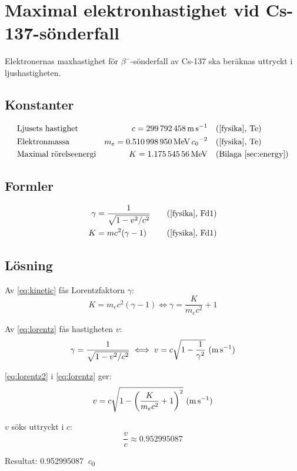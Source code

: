 \section{Maximal elektronhastighet vid Cs-137-sönderfall} \label{sec:speed}

Elektronernas maxhastighet för $\beta^-$-sönderfall av Cs-137 ska beräknas
uttryckt i ljushastigheten.

\subsection*{Konstanter}

\begin{align*}
    & \text{Ljusets hastighet}     & c   = \qty{299792458}{\m\per\s}                  &\quad \fysika{Te}                      \\
    & \text{Elektronmassa}         & m_e = \qty{0.510998950}{\MeV\per\clight\squared} &\quad \fysika{Te}                      \\
    & \text{Maximal rörelseenergi} & K   = \qty{1.17554556}{\MeV}                     &\quad \text{(Bilaga~\ref{sec:energy})}
\end{align*}

\subsection*{Formler}

\begin{align}
    \gamma &= \frac{1}{\sqrt{1 - v^2/c^2}} &\quad \fysika{Fd1} \label{eq:lorentz} \\
         K &= mc^2(\gamma - 1)             &\quad \fysika{Fd1} \label{eq:kinetic}
\end{align}

\subsection*{Lösning}

Av \eqref{eq:kinetic} fås Lorentzfaktorn $\gamma$:
%
\begin{equation}
    K = m_e c^2(\gamma - 1) \iff \gamma = \frac{K}{m_e c^2} + 1 \label{eq:lorentz2}
\end{equation}

Av \eqref{eq:lorentz} fås hastigheten $v$:
%
\begin{equation}
    \gamma = \frac{1}{\sqrt{1 - v^2/c^2}} \iff v = c \sqrt{1 - \frac{1}{\gamma^2}}~\text{(\unit{\m\per\s})} \label{eq:speed}
\end{equation}

\eqref{eq:lorentz2} i \eqref{eq:lorentz} ger:
%
\begin{equation}
    v = c \sqrt{1 - \left( \frac{K}{m_e c^2} + 1 \right)^2}~\text{(\unit{\m\per\s})}
\end{equation}

$v$ söks uttryckt i $c$:
%
\begin{equation}
    \frac{v}{c} \approx \num{0.952995087}
\end{equation}

Resultat: \qty{0.952995087}{\clight}
